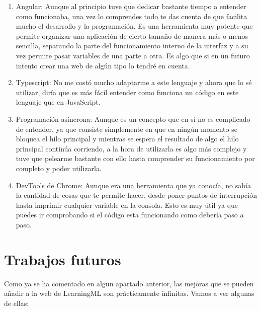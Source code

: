 \documentclass[a4paper, 12pt]{book}
\begin{document}
\begin{enumerate}
  \item Angular: Aunque al principio tuve que dedicar bastante tiempo a entender como funcionaba, una vez lo comprendes todo te das cuenta de que facilita mucho el desarrollo y la programación. Es una herramienta muy potente que permite organizar una aplicación de cierto tamaño de manera más o menos sencilla, separando la parte del funcionamiento interno de la interfaz y a su vez permite pasar variables de una parte a otra. Es algo que si en un futuro intento crear una web de algún tipo lo tendré en cuenta.

  \item Typescript: No me costó mucho adaptarme a este lenguaje y ahora que lo sé utilizar, diría que es más fácil entender como funciona un código en este lenguaje que en JavaScript.

  \item Programación asíncrona:  Aunque es un concepto que en sí no es complicado de entender, ya que consiste simplemente en que en ningún momento se bloquea el hilo principal y mientras se espera el resultado de algo el hilo principal continúa corriendo, a la hora de utilizarla es algo más complejo y tuve que pelearme bastante con ello hasta comprender su funcionamiento por completo y poder utilizarla.

  \item DevTools de Chrome: Aunque era una herramienta que ya conocía, no sabía la cantidad de cosas que te permite hacer, desde poner puntos de interrupción hasta imprimir cualquier variable en la consola. Esto es muy útil ya que puedes ir comprobando si el código esta funcionando como debería paso a paso.
\end{enumerate}



\section{Trabajos futuros}
\label{sec:trabajos_futuros}

Como ya se ha comentado en algun apartado anterior, las mejoras que se pueden añadir a la web de LearningML son prácticamente infinitas. Vamos a ver algunas de ellas: 
\end{document}
